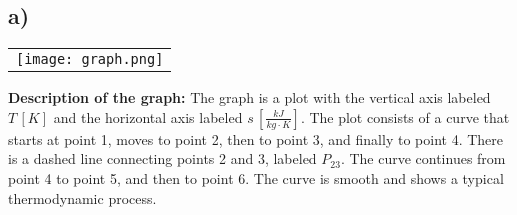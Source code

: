 

\subsection*{a)}

\begin{center}
\begin{tabular}{c}
\texttt{[image: graph.png]}
\end{tabular}
\end{center}

\textbf{Description of the graph:} The graph is a plot with the vertical axis labeled $T \, [K]$ and the horizontal axis labeled $s \, \left[\frac{kJ}{kg \cdot K}\right]$. The plot consists of a curve that starts at point 1, moves to point 2, then to point 3, and finally to point 4. There is a dashed line connecting points 2 and 3, labeled $P_{23}$. The curve continues from point 4 to point 5, and then to point 6. The curve is smooth and shows a typical thermodynamic process.